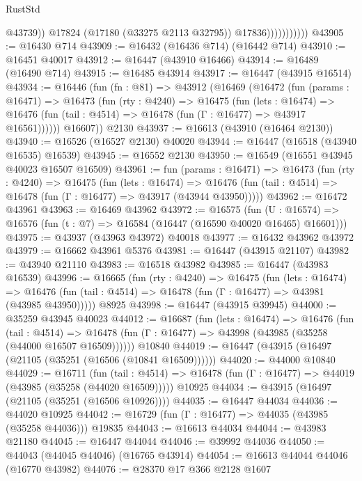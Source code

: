 \begin{lexlean}{RustStd}
\begin{coremodule}
                              @43739))
                          @17824
                          (@17180 (@33275 @2113 @32795))
                          @17836)))))))))))
@43905 := @16430 @714
@43909 := @16432 (@16436 @714) (@16442 @714)
@43910 := @16451 @40017
@43912 := @16447 (@43910 @16466)
@43914 := @16489 (@16490 @714)
@43915 := @16485 @43914
@43917 := @16447 (@43915 @16514)
@43934 := @16446
    (fun (fn : @81) =>
    @43912
      (@16469
        (@16472
          (fun (params : @16471) =>
          @16473
            (fun (rty : @4240) =>
            @16475
              (fun (lets : @16474) =>
              @16476 (fun (tail : @4514) => @16478 (fun (Γ : @16477) => @43917 @16561))))))
        @16607))
    @2130
@43937 := @16613 (@43910 (@16464 @2130))
@43940 := @16526 (@16527 @2130) @40020
@43944 := @16447 (@16518 (@43940 @16535) @16539)
@43945 := @16552 @2130
@43950 := @16549 (@16551 @43945 @40023 @16507 @16509)
@43961 := fun (params : @16471) =>
  @16473
    (fun (rty : @4240) =>
    @16475
      (fun (lets : @16474) =>
      @16476 (fun (tail : @4514) => @16478 (fun (Γ : @16477) => @43917 (@43944 @43950)))))
@43962 := @16472 @43961
@43963 := @16469 @43962
@43972 := @16575
    (fun (U : @16574) => @16576 (fun (t : @7) => @16584 (@16447 (@16590 @40020 @16465) @16601)))
@43975 := @43937 (@43963 @43972) @40018
@43977 := @16432 @43962 @43972
@43979 := @16662 @43961 @5376
@43981 := @16447 (@43915 @21107)
@43982 := @43940 @21110
@43983 := @16518 @43982
@43985 := @16447 (@43983 @16539)
@43996 := @16665
    (fun (rty : @4240) =>
    @16475
      (fun (lets : @16474) =>
      @16476 (fun (tail : @4514) => @16478 (fun (Γ : @16477) => @43981 (@43985 @43950)))))
    @8925
@43998 := @16447 (@43915 @39945)
@44000 := @35259 @43945 @40023
@44012 := @16687
    (fun (lets : @16474) =>
    @16476
      (fun (tail : @4514) =>
      @16478 (fun (Γ : @16477) => @43998 (@43985 (@35258 (@44000 @16507 @16509))))))
    @10840
@44019 := @16447 (@43915 (@16497 (@21105 (@35251 (@16506 (@10841 @16509))))))
@44020 := @44000 @10840
@44029 := @16711
    (fun (tail : @4514) => @16478 (fun (Γ : @16477) => @44019 (@43985 (@35258 (@44020 @16509)))))
    @10925
@44034 := @43915 (@16497 (@21105 (@35251 (@16506 @10926))))
@44035 := @16447 @44034
@44036 := @44020 @10925
@44042 := @16729 (fun (Γ : @16477) => @44035 (@43985 (@35258 @44036))) @19835
@44043 := @16613 @44034
@44044 := @43983 @21180
@44045 := @16447 @44044
@44046 := @39992 @44036
@44050 := @44043 (@44045 @44046) (@16765 @43914)
@44054 := @16613 @44044 @44046 (@16770 @43982)
@44076 := @28370
    @17
    @366
    @2128
    @1607

\end{coremodule}
\end{lexlean}
